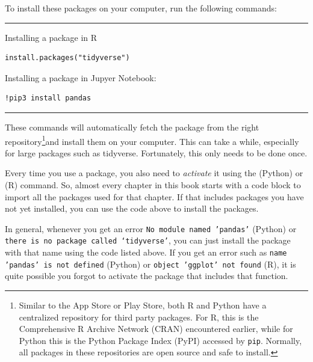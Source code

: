 To install these packages on your computer, run the following commands:


\noindent\rule{\textwidth}{.5pt}\vspace{-1em}

\noindent\begin{minipage}[t]{.5\textwidth}
Installing a package in R
\begin{verbatim}
install.packages("tidyverse")
\end{verbatim}
\end{minipage}
\begin{minipage}[t]{.45\textwidth}
  Installing a package in Jupyer Notebook:
\begin{verbatim}
!pip3 install pandas
\end{verbatim}
\end{minipage}
\vspace{.5em}

\noindent\rule{\textwidth}{.5pt}

\newcommand{\fnrepo}{\footnote{Similar to the App Store or Play Store, both R and Python have a centralized repository for third party packages.  For R, this is the Comprehensive R Archive Network (CRAN) encountered earlier,
    while for Python this is the Python Package Index (PyPI) accessed by \verb|pip|.  Normally, all packages in these repositories are open source and safe to install.}}

These commands will automatically fetch the package from the right repository\fnrepo and install them on your computer. This can take a while, especially for large packages such as tidyverse.
Fortunately, this only needs to be done once.

Every time you use a package, you also need to \emph{activate} it using the  (Python) or   (R) command.
So, almost every chapter in this book starts with a code block to import all the packages used for that chapter.
If that includes packages you have not yet installed, you can use the code above to install the packages.

In general, whenever you get an error \texttt{No module named 'pandas'} (Python) or \texttt{there is no package called ‘tidyverse’},
you can just install the package with that name using the code listed above.
If you get an error such as \texttt{name 'pandas' is not defined} (Python) or \texttt{object 'ggplot' not found} (R),
it is quite possible you forgot to activate the package that includes that function. 

